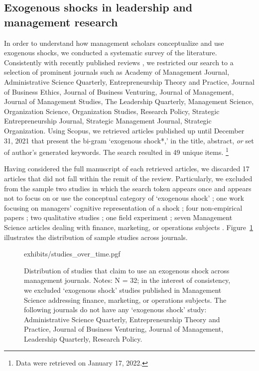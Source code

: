 \begin{refsection}
\subsection{Exogenous shocks in leadership and management research}
\label{subsec:exogenous_shocks_in_management}

\noindent In order to understand how management scholars conceptualize and use
exogenous shocks, we conducted a systematic survey of the literature. 
Consistently with recently published reviews 
\parencite[e.g.,][]{gonzalez_et_al_2018,rindova_et_al_2018}, we restricted our
search to a selection of prominent journals such as Academy of Management
Journal, Administrative Science Quarterly, Entrepreneurship Theory and Practice,
Journal of Business Ethics, Journal of Business Venturing, Journal of
Management, Journal of Management Studies, The Leadership Quarterly, Management
Science, Organization Science, Organization Studies, Research Policy, Strategic
Entrepreneurship Journal, Strategic Management Journal, Strategic Organization.
Using Scopus, we retrieved articles published up until December 31, 2021
that present the bi-gram `exogenous shock*,' in the title, abstract, \emph{or} set of
author's generated keywords. The search resulted in 49 unique items.
\footnote{Data were retrieved on January 17, 2022.}

Having considered the full manuscript of each retrieved articles, we discarded
17 articles that did not fall within the remit of the review. Particularly, 
we excluded from the sample two studies in which the search token appears once and 
appears not to focus on or use the conceptual category of `exogenous shock'
\parencite{uzzi199735,kriauciunas2006659}; one work focusing on managers'
cognitive representation of a shock \parencite{barreto2013687}; four non-empirical papers
\parencite[e.g.,][]{mcsweeney2009933}; two qualitative studies
\parencite[i.e.,][]{glynn20051031, jenkins2010884}; one field experiment 
\parencite{cui20191216}; seven Management Science articles dealing with 
finance, marketing, or operations subjects \parencite[e.g.][]{tham20182901}.
Figure~\ref{fig:studies_across_journals} illustrates the distribution of sample
studies across journals.

\begin{figure}[!htbp]
    \centering
    {exhibits/studies_over_time.pgf}
    \caption{Distribution of studies that claim to use an exogenous shock across
    management journals.  Notes: N = 32; in the interest of consistency, we
    excluded `exogenous shock' studies published in Management Science addressing
    finance, marketing, or operations subjects. The following journals do not have any
    `exogenous shock' study: Administrative Science Quarterly, Entrepreneurship
    Theory and Practice, Journal of Business Venturing, Journal of Management,
    Leadership Quarterly, Research Policy.}
    \label{fig:studies_across_journals}
\end{figure}         


\end{refsection}
